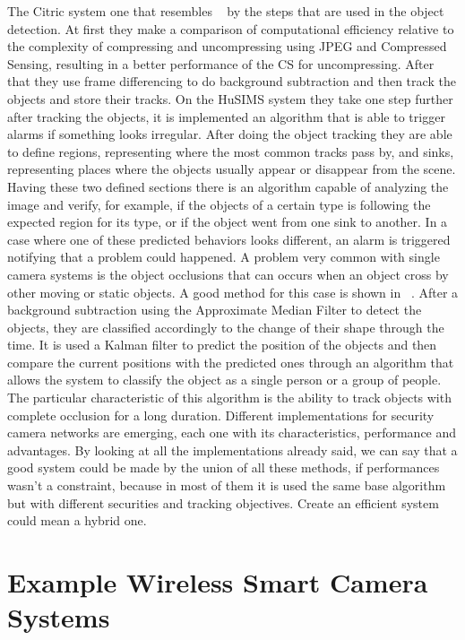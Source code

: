 \documentclass[journal,transmag]{IEEEtran}
\begin{document}
The Citric system one that resembles ~\cite{CS-MoG} by the steps that are used in the object detection. At first they make a comparison of computational efficiency relative to the complexity of compressing and uncompressing using JPEG and Compressed Sensing, resulting in a better performance of the CS  for uncompressing. After that they use frame differencing to do background subtraction and then track the objects and store their tracks.
On the HuSIMS system they take one step further after tracking the objects, it is implemented an algorithm that is able to trigger alarms if something looks irregular. After doing the object tracking they are able to define regions, representing where the most common tracks pass by, and sinks, representing places where the objects usually appear or disappear from the scene. Having these two defined sections there is an algorithm capable of analyzing the image and verify, for example, if the objects of a certain type is following the expected region for its type, or if the object went from one sink to another. In a case where one of these predicted behaviors looks different, an alarm is triggered notifying that a problem could happened.
A problem very common with single camera systems is the object occlusions that can occurs when an object cross by other moving or static objects. A good method for this case is shown in ~\cite{Occlusion}. After a background subtraction using the Approximate Median Filter to detect the objects, they are classified accordingly to the change of their shape through the time. It is used a Kalman filter to predict the position of the objects and then compare the current positions with the predicted ones through an algorithm that allows the system to classify the object as a single person or a group of people. The particular characteristic of this algorithm is the ability to track objects with complete occlusion for a long duration.
Different implementations for security camera networks are emerging, each one with its characteristics, performance and advantages. By looking at all the implementations already said, we can say that a good system could be made by the union of all these methods, if performances wasn’t a constraint, because in most of them it is used the same base algorithm but with different securities and tracking objectives. Create an efficient system could mean a hybrid one.

\section{Example Wireless Smart Camera Systems}
\end{document}
